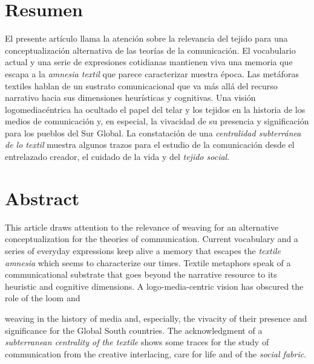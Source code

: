 \documentclass{tufte-handout}
\begin{document}
\begin{titlepage}
\vspace*{2.5em}


\hypertarget{resumen}{%
\section{Resumen}\label{resumen}}

El presente artículo llama la atención sobre la relevancia del tejido
para una conceptualización alternativa de las teorías de la
comunicación. El vocabulario actual y una serie de expresiones
cotidianas mantienen viva una memoria que escapa a la \emph{amnesia
textil} que parece caracterizar nuestra época. Las metáforas textiles
hablan de un sustrato comunicacional que va más allá del recurso
narrativo hacia sus dimensiones heurísticas y cognitivas. Una visión
logomediacéntrica ha ocultado el papel del telar y los tejidos en la
historia de los medios de comunicación y, en especial, la vivacidad de
su presencia y significación para los pueblos del Sur Global. La
constatación de una \emph{centralidad subterránea de lo textil} muestra
algunos trazos para el estudio de la comunicación desde el entrelazado
creador, el cuidado de la vida y del \emph{tejido social}.

\hypertarget{abstract}{%
\section{Abstract}\label{abstract}}

This article draws attention to the relevance of weaving for an
alternative conceptualization for the theories of communication. Current
vocabulary and a series of everyday expressions keep alive a memory that
escapes the \emph{textile amnesia} which seems to characterize our times.
Textile metaphors speak of a communicational substrate that goes beyond
the narrative resource to its heuristic and cognitive dimensions. A logo-media-centric vision has obscured the role of the loom and

\enlargethispage{2\baselineskip}

\vspace*{2em}



 \end{titlepage}


\noindent weaving
in the history of media and, especially, the vivacity of their presence
and significance for the Global South countries. The acknowledgment of a
\emph{subterranean centrality of the textile} shows some traces for the study
of communication from the creative interlacing, care for life and of the
\emph{social fabric}.
\end{document}
